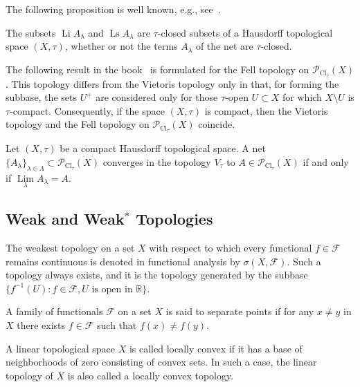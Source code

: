 \documentclass{svproc}
\def\Cl{\operatorname{Cl}}
\def\Li{\operatorname{Li}}
\def\Ls{\operatorname{Ls}}
\def\Lim{\operatorname{Lim}}
\begin{document}
The following proposition is well known, e.g., see~\cite{Beer}.

\begin{proposition}
The subsets $\Li A_{\lambda}$ and $\Ls A_{\lambda}$ are $\tau$-closed subsets of a Hausdorff topological space $(X, \tau)$, whether or not the terms $A_{\lambda}$ of the net are $\tau$-closed.
\end{proposition}

The following result in the book~\cite{Beer} is formulated for the Fell topology on $\mathcal{P}_{\Cl_{\tau}}(X)$. This topology differs from the Vietoris topology only in that, for forming the subbase, the sets $U^+$ are considered only for those $\tau$-open $U\subset X$ for which $X\setminus U$ is $\tau$-compact. Consequently, if the space $(X, \tau)$ is compact, then the Vietoris topology and the Fell topology on $\mathcal{P}_{\Cl_{\tau}}(X)$ coincide.

\begin{theorem}\label{thm:Kuratow}
Let $(X, \tau)$ be a compact Hausdorff topological space. A net $\{A_{\lambda}\}_{\lambda\in \Lambda}\subset \mathcal{P}_{\Cl_{\tau}}(X)$ converges in the topology $V_{\tau}$ to $A\in \mathcal{P}_{\Cl_{\tau}}(X)$ if and only if $\Lim\limits_{\lambda} A_{\lambda} = A$.
\end{theorem}


\subsection{Weak and Weak$^*$ Topologies}\label{sec:weak_top}

The weakest topology on a set $X$ with respect to which every functional $f\in \mathcal{F}$ remains continuous is denoted in functional analysis by $\sigma(X, \mathcal{F})$. Such a topology always exists, and it is the topology generated by the subbase $\bigl\{f^{-1}(U)\colon f\in \mathcal{F}, U \text{ is open in }\mathbb{R}\bigr\}$.

\begin{definition}
A family of functionals $\mathcal{F}$ on a set $X$ is said to separate points if for any $x\neq y$ in $X$ there exists $f\in \mathcal{F}$ such that $f(x)\neq f(y)$.
\end{definition}

\begin{definition}
A linear topological space $X$ is called locally convex if it has a base of neighborhoods of zero consisting of convex sets. In such a case, the linear topology of $X$ is also called a locally convex topology.
\end{definition}
\end{document}
